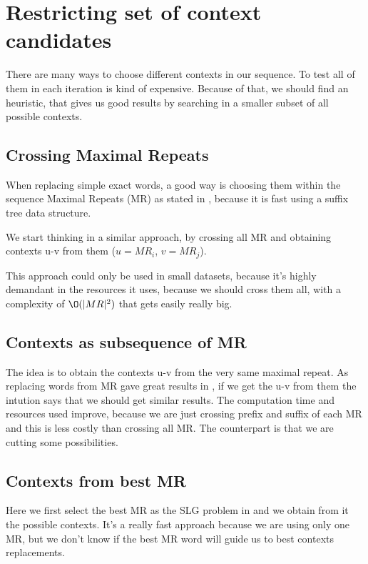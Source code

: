 \chapter{Restricting set of context candidates}

	There are many ways to choose different contexts in our sequence. To test all of them in each iteration is kind of expensive. Because of that,
	we should find an heuristic, that gives us good results by searching in a smaller
	subset of all possible contexts.

	\section{Crossing Maximal Repeats}

	When replacing simple exact words, a good way is choosing them within the
	sequence Maximal Repeats (MR) as stated in \cite{GThesis}, because it is fast
	using a suffix tree data structure.

	We start thinking in a similar approach, by crossing all MR
	and obtaining contexts u-v from them ($u = MR_i$, $v = MR_j$).

	This approach could only be used in small datasets, because it's highly demandant
	in the resources it uses, because we should cross them all, with a complexity
	of $\O(|MR|^2)$ that gets easily really big.


	\section{Contexts as subsequence of MR}

	The idea is to obtain the contexts u-v from the very same maximal repeat. As replacing
	words from MR gave great results in \cite{GThesis}, if we get the u-v from
	them the intution says that we should get similar results. The computation time and
	resources used improve, because we are just crossing prefix and suffix of each
	MR and this is less costly than crossing all MR.
	The counterpart is that we are cutting some possibilities.

	\section{Contexts from best MR}

	Here we first select the best MR as the SLG problem in \cite{GThesis} and we obtain
	from it the possible contexts.
	It's a really fast approach because we are using only one MR, but we don't know
	if the best MR word will guide us to best contexts replacements.

